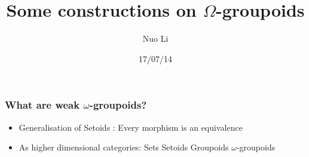 \documentclass[12pt, mathserif,handout]{beamer}
\author{
Nuo Li
}
\institute{
School of Computer Science \\  University of Nottingham, UK
}
\date[17/07/14]{17/07/14}
\title{Some constructions on $\Omega$-groupoids}
\subtitle[LFMTP 2014]{}
\newcommand{\og}{ $\omega$-groupoids}
\newcommand{\wog}{weak $\omega$-groupoids}
\begin{document}
\frame{\titlepage}




\begin{frame}
\frametitle{What are \wog?}


\begin{itemize}
\item {Generalisation of Setoids : Every morphism is an equivalence}
\pause
\item{As higher dimensional categories: Sets Setoids Groupoids \og{}}

\end{itemize}

\pause

\begin{columns}[c] %

\begin{column}{2cm} 



\end{column}

\pause

\begin{column}{3cm}
\end{column}



\pause

\begin{column}{5cm}
\end{column}



\end{columns}

\end{frame}



\end{document}
